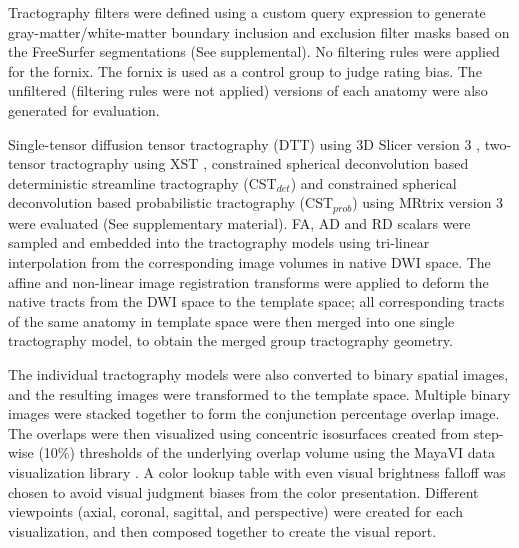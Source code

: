 Tractography filters were defined using a custom query expression to generate gray-matter/white-matter boundary inclusion and exclusion filter masks based on the FreeSurfer segmentations (See supplemental). No filtering rules were applied for the fornix. The fornix is used as a control group to judge rating bias. The unfiltered (filtering rules were not applied) versions of each anatomy were also generated for evaluation. 

Single-tensor diffusion tensor tractography (DTT) using 3D Slicer version 3 \cite{Pieper2006,Tuch2000d}, two-tensor tractography using XST \cite{Qazi2009}, constrained spherical deconvolution based deterministic streamline tractography (CST$_{det}$) \cite{Tournier2012b} and constrained spherical deconvolution based probabilistic tractography (CST$_{prob}$) \cite{Tournier2010} using MRtrix version 3  were evaluated (See supplementary material).  
FA, AD and RD scalars were sampled and embedded into the tractography models using tri-linear interpolation from the corresponding image volumes in native DWI space. The affine and non-linear image registration transforms were applied to deform the native tracts from the DWI space to the template space; all corresponding tracts of the same anatomy in template space were then merged into one single tractography model, to obtain the merged group tractography geometry. 

The individual tractography models were also converted to binary spatial images, and the resulting images were transformed to the template space. Multiple binary images were stacked together to form the conjunction percentage overlap image. The overlaps were then visualized using concentric isosurfaces created from step-wise (10\%) thresholds of the underlying overlap volume using the MayaVI data visualization library \cite{Ramachandran2011}. A color lookup table with even visual brightness falloff \cite{VanderWalt2015} was chosen to avoid visual judgment biases from the color presentation. Different viewpoints (axial, coronal, sagittal, and perspective) were created for each visualization, and then composed together to create the visual report. 

